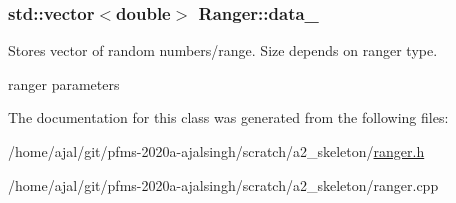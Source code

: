 \subsubsection[{\texorpdfstring{data\+\_\+}{data_}}]{\setlength{\rightskip}{0pt plus 5cm}std\+::vector$<$double$>$ Ranger\+::data\+\_\+\hspace{0.3cm}{\ttfamily [private]}}\hypertarget{classRanger_adef7fed47f032646f5023046de0bbc48}{}\label{classRanger_adef7fed47f032646f5023046de0bbc48}


Stores vector of random numbers/range. Size depends on ranger type. 

ranger parameters 

The documentation for this class was generated from the following files\+:\begin{DoxyCompactItemize}
\item 
/home/ajal/git/pfms-\/2020a-\/ajalsingh/scratch/a2\+\_\+skeleton/\hyperlink{ranger_8h}{ranger.\+h}\item 
/home/ajal/git/pfms-\/2020a-\/ajalsingh/scratch/a2\+\_\+skeleton/ranger.\+cpp\end{DoxyCompactItemize}
